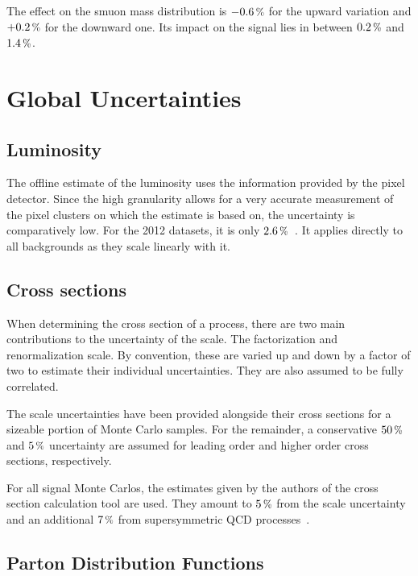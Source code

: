 The effect on the smuon mass distribution is $-0.6\,\pct$ for the upward variation and $+0.2\,\pct$ for the downward one. Its impact on the signal lies in between $0.2\,\pct$ and $1.4\,\pct$. 



\section{Global Uncertainties}
\label{sec:glblsys}

\subsection{Luminosity}
\label{sec:lumisys}

The offline estimate of the luminosity uses the information provided by the pixel detector. Since the high granularity allows for a very accurate measurement of the pixel clusters on which the estimate is based on, the uncertainty is comparatively low. For the 2012 datasets, it is only $2.6\,\pct$~\cite{lumisys}. It applies directly to all backgrounds as they scale linearly with it.


\subsection{Cross sections}
\label{sec:xssys}

When determining the cross section of a process, there are two main contributions to the uncertainty of the scale. The factorization and renormalization scale. By convention, these are varied up and down by a factor of two to estimate their individual uncertainties. They are also assumed to be fully correlated.

The scale uncertainties have been provided alongside their cross sections for a sizeable portion of Monte Carlo samples. For the remainder, a conservative $50\,\pct$ and $5\,\pct$ uncertainty are assumed for leading order and higher order cross sections, respectively.

For all signal Monte Carlos, the estimates given by the authors of the cross section calculation tool are used. They amount to $5\,\pct$ from the scale uncertainty and an additional $7\,\pct$ from supersymmetric QCD processes~\cite{susyxstool}.


\subsection{Parton Distribution Functions}
\label{sec:pdfsys}

